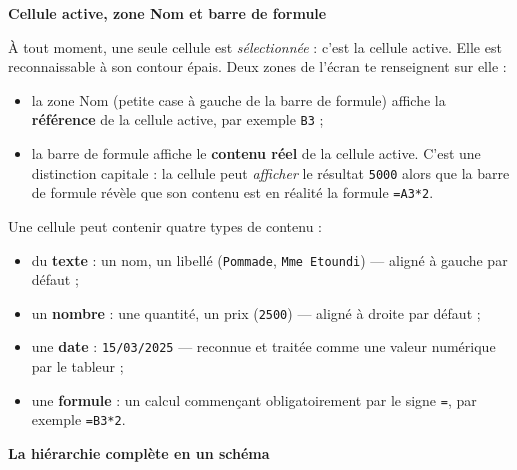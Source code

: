 \documentclass[11pt]{article}
\newcommand{\cle}[1]{{\popxbold\color{popdark}#1}}
\begin{document}
\textbf{Cellule active, zone Nom et barre de formule}\par

À tout moment, une seule cellule est \emph{sélectionnée} : c'est la \cle{cellule active}. Elle est reconnaissable à son contour épais. Deux zones de l'écran te renseignent sur elle :

\begin{itemize}
\item la \cle{zone Nom} (petite case à gauche de la barre de formule) affiche la \textbf{référence} de la cellule active, par exemple \texttt{B3} ;
\item la \cle{barre de formule} affiche le \textbf{contenu réel} de la cellule active. C'est une distinction capitale : la cellule peut \emph{afficher} le résultat \texttt{5000} alors que la barre de formule révèle que son contenu est en réalité la formule \texttt{=A3*2}.
\end{itemize}

\begin{aretenir}
Une cellule peut contenir quatre types de contenu :
\begin{itemize}
\item du \textbf{texte} : un nom, un libellé (\texttt{Pommade}, \texttt{Mme Etoundi}) — aligné à gauche par défaut ;
\item un \textbf{nombre} : une quantité, un prix (\texttt{2500}) — aligné à droite par défaut ;
\item une \textbf{date} : \texttt{15/03/2025} — reconnue et traitée comme une valeur numérique par le tableur ;
\item une \textbf{formule} : un calcul commençant obligatoirement par le signe \texttt{=}, par exemple \texttt{=B3*2}.
\end{itemize}
\end{aretenir}

\textbf{La hiérarchie complète en un schéma}\par
\end{document}
